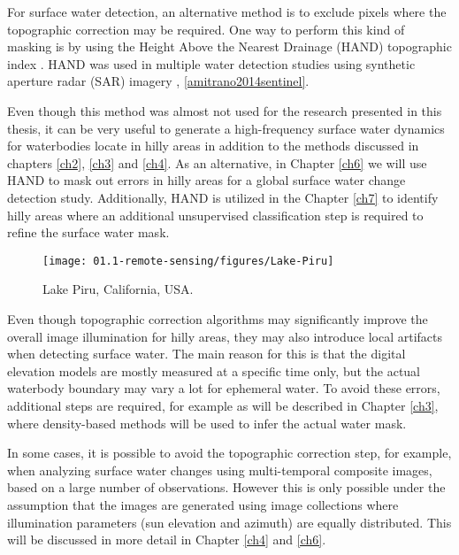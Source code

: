 For surface water detection, an alternative method is to exclude pixels where the topographic correction may be required. One way to perform this kind of masking is by using the Height Above the Nearest Drainage (HAND) topographic index \cite{Renno2008, Nobre2011}. HAND was used in multiple water detection studies using synthetic aperture radar (SAR) imagery \citet{Eilander2014}, \ref{amitrano2014sentinel}.


Even though this method was almost not used for the research presented in this thesis, it can be very useful to generate a high-frequency surface water dynamics for waterbodies locate in hilly areas in addition to the methods discussed in chapters \ref{ch2}, \ref{ch3} and \ref{ch4}. As an alternative, in Chapter \ref{ch6} we will use HAND to mask out errors in hilly areas for a global surface water change detection study. Additionally, HAND is utilized in the Chapter \ref{ch7} to identify hilly areas where an additional unsupervised classification step is required to refine the surface water mask.

\begin{wrapfigure}{r}{0.5\textwidth}
	\begin{center}
		\texttt{[image: 01.1-remote-sensing/figures/Lake-Piru]}
	\end{center}
	\caption{Lake Piru, California, USA. \protect \footnotemark}
\end{wrapfigure}


Even though topographic correction algorithms may significantly improve the overall image illumination for hilly areas, they may also introduce local artifacts when detecting surface water. The main reason for this is that the digital elevation models are mostly measured at a specific time only, but the actual waterbody boundary may vary a lot for ephemeral water. To avoid these errors, additional steps are required, for example as will be described in Chapter \ref{ch3}, where density-based methods will be used to infer the actual water mask.

In some cases, it is possible to avoid the topographic correction step, for example, when analyzing surface water changes using multi-temporal composite images, based on a large number of observations. However this is only possible under the assumption that the images are generated using image collections where illumination parameters (sun elevation and azimuth) are equally distributed. This will be discussed in more detail in Chapter \ref{ch4} and \ref{ch6}.

